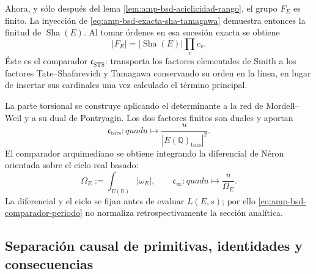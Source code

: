 Ahora, y sólo después del lema
\ref{lem:amp-bsd-aciclicidad-rango}, el grupo \(F_E\) es finito. La
inyección de \eqref{eq:amp-bsd-exacta-sha-tamagawa} demuestra entonces la
finitud de \(\operatorname{Sha}(E)\). Al tomar órdenes en esa sucesión
exacta se obtiene
\begin{equation}\label{eq:amp-bsd-cardinal-smith}
 |F_E|=|\operatorname{Sha}(E)|\prod_v c_v.
\end{equation}
Éste es el comparador
\(\mathfrak c_{\mathrm{STS}}\): transporta los factores elementales de Smith
a los factores Tate--Shafarevich y Tamagawa conservando su orden en la línea,
en lugar de insertar sus cardinales una vez calculado el término principal.

La parte torsional se construye aplicando el determinante a la red de
Mordell--Weil y a su dual de Pontryagin. Los dos factores finitos son duales y
aportan
\begin{equation}\label{eq:amp-bsd-comparador-torsion}
 \mathfrak c_{\mathrm{tors}}:quad
 u\longmapsto
 \frac{u}{|E(\mathbb Q)_{\mathrm{tors}}|^2}.
\end{equation}
El comparador arquimediano se obtiene integrando la diferencial de Néron
orientada sobre el ciclo real basado:
\begin{equation}\label{eq:amp-bsd-comparador-periodo}
 \Omega_E:=\int_{E(\mathbb R)}|\omega_E|,
 \qquad
 \mathfrak c_\infty:quad u\longmapsto\frac{u}{\Omega_E}.
\end{equation}
La diferencial y el ciclo se fijan antes de evaluar \(L(E,s)\); por ello
\eqref{eq:amp-bsd-comparador-periodo} no normaliza retrospectivamente la
sección analítica.

\subsection{Separación causal de primitivas, identidades y consecuencias}
\label{subsec:amp-bsd-separacion-causal}


